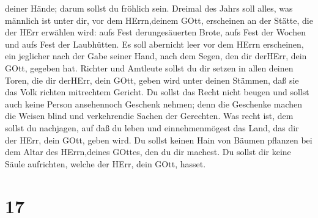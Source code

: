 deiner Hände; darum sollst du fröhlich sein.  Dreimal des
Jahrs soll alles, was männlich ist unter dir, vor dem HErrn,deinem GOtt,
erscheinen an der Stätte, die der HErr erwählen wird: aufs Fest
derungesäuerten Brote, aufs Fest der Wochen und aufs Fest der
Laubhütten. Es soll abernicht leer vor dem HErrn erscheinen,
 ein jeglicher nach der Gabe seiner Hand, nach dem Segen,
den dir derHErr, dein GOtt, gegeben hat.  Richter und
Amtleute sollst du dir setzen in allen deinen Toren, die dir derHErr,
dein GOtt, geben wird unter deinen Stämmen, daß sie das Volk richten
mitrechtem Gericht.  Du sollst das Recht nicht beugen und
sollst auch keine Person ansehennoch Geschenk nehmen; denn die Geschenke
machen die Weisen blind und verkehrendie Sachen der Gerechten.
 Was recht ist, dem sollst du nachjagen, auf daß du leben
und einnehmenmögest das Land, das dir der HErr, dein GOtt, geben wird.
 Du sollst keinen Hain von Bäumen pflanzen bei dem Altar
des HErrn,deines GOttes, den du dir machest.  Du sollst dir
keine Säule aufrichten, welche der HErr, dein GOtt, hasset.

\hypertarget{section-16}{%
\section{17}\label{section-16}}


